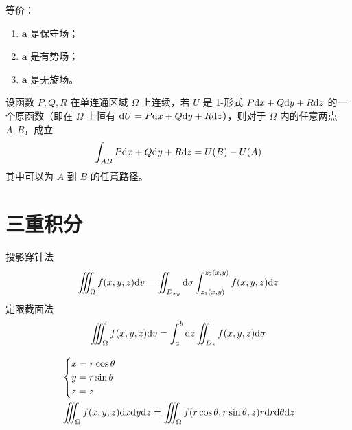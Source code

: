 \documentclass{ctexbook}
\def\diff{\textnormal{d}}
\begin{document}
\begin{theorem}
    等价：
    \begin{enumerate}
        \item $\boldsymbol{a}$ 是保守场；
        \item $\boldsymbol{a}$ 是有势场；
        \item $\boldsymbol{a}$ 是无旋场。
    \end{enumerate}
\end{theorem}

\begin{theorem}[原函数求曲线积分]
    设函数 $P, Q, R$ 在单连通区域 $\Omega$ 上连续，若 $U$ 是 1-形式 $P\diff x+Q\diff y+R\diff z$ 的一个原函数（即在 $\Omega$ 上恒有 $\diff U=P\diff x+Q\diff y+R\diff z$），则对于 $\Omega$ 内的任意两点 $A, B$，成立
    \begin{equation}
        \int_{AB}P\diff x+Q\diff y+R\diff z=U(B)-U(A)
    \end{equation}
    其中可以为 $A$ 到 $B$ 的任意路径。
\end{theorem}

\section{三重积分}

\begin{proposition}[直角坐标系]
    投影穿针法
    \begin{equation}
        \iiint_\Omega f(x,y,z)\diff v=\iint_{D_{xy}}\diff\sigma\int_{z_1(x,y)}^{z_2(x,y)}f(x,y,z)\diff z
    \end{equation}
    定限截面法
    \begin{equation}
        \iiint_{\Omega}f(x,y,z)\diff v=\int_a^b\diff z\iint_{D_z}f(x,y,z)\diff\sigma
    \end{equation}
\end{proposition}

\begin{proposition}[柱面坐标系]
    \begin{align}
        &\begin{cases}
            x=r\cos\theta\\
            y=r\sin\theta\\
            z=z
        \end{cases}\\
        &\iiint_\Omega f(x,y,z)\diff x\diff y\diff z=\iiint_\Omega f(r\cos\theta,r\sin\theta,z)r\diff r\diff\theta\diff z
    \end{align}
\end{proposition}
\end{document}
